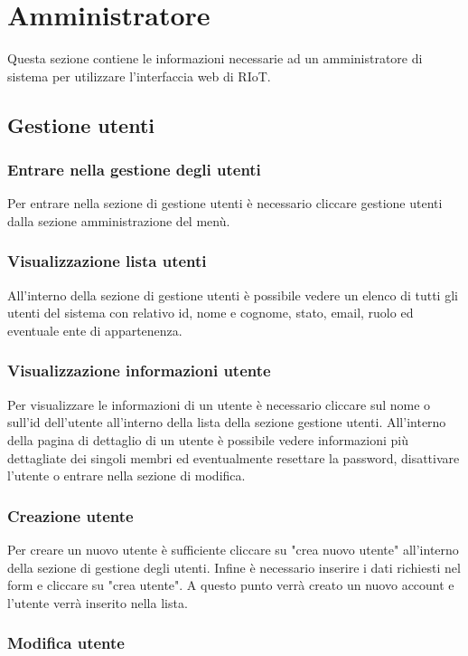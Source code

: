 \section{Amministratore}
Questa sezione contiene le informazioni necessarie ad un amministratore di sistema per utilizzare l'interfaccia web di RIoT.

\subsection{Gestione utenti}

	\subsubsection{Entrare nella gestione degli utenti}
		Per entrare nella sezione di gestione utenti è necessario cliccare gestione utenti dalla sezione amministrazione del menù. 

	\subsubsection{Visualizzazione lista utenti}	
		All'interno della sezione di gestione utenti è possibile vedere un elenco di tutti gli utenti del sistema con relativo id, nome e cognome, stato, email, ruolo ed eventuale ente di appartenenza. 

	\subsubsection{Visualizzazione informazioni utente}	
		Per visualizzare le informazioni di un utente è necessario cliccare sul nome o sull'id dell'utente all'interno della lista della sezione gestione utenti.
		All'interno della pagina di dettaglio di un utente è possibile vedere informazioni più dettagliate dei singoli membri ed eventualmente resettare la password, disattivare l'utente o entrare nella sezione di modifica.

	\subsubsection{Creazione utente}
		Per creare un nuovo utente è sufficiente cliccare su "crea nuovo utente" all'interno della sezione di gestione degli utenti. Infine è necessario inserire i dati richiesti nel form e cliccare su "crea utente". 
		A questo punto verrà creato un nuovo account e l'utente verrà inserito nella lista.

	\subsubsection{Modifica utente}

